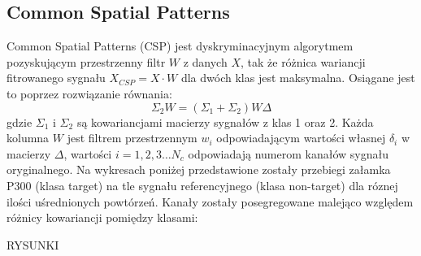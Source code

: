\documentclass[licencjacka,openright]{pracamgr}
\begin{document}
\subsection{Common Spatial Patterns}
Common Spatial Patterns (CSP) jest dyskryminacyjnym algorytmem pozyskującym przestrzenny filtr $W$ z danych $X$, tak że różnica wariancji fitrowanego sygnału $X_{CSP} = X \cdot W$ dla dwóch klas jest maksymalna. Osiągane jest to poprzez rozwiązanie równania:
\begin{equation}
\Sigma _2 W = (\Sigma _1 + \Sigma _2 )W \Delta
\end{equation}
gdzie $\Sigma_1$ i $\Sigma_2$ są kowariancjami macierzy sygnałów z klas 1 oraz 2. Każda kolumna $W$ jest filtrem przestrzennym $w_i$ odpowiadającym wartości własnej $\delta _i$ w macierzy $\Delta$, wartości $i = 1,2,3 \ldots N_c$ odpowiadają numerom kanałów sygnału oryginalnego. \citep{sannelli2011}
Na wykresach poniżej przedstawione zostały przebiegi załamka P300 (klasa target) na tle sygnału referencyjnego (klasa non-target) dla róznej ilości uśrednionych powtórzeń. Kanały zostały posegregowane malejąco względem różnicy kowariancji pomiędzy klasami:

RYSUNKI






\end{document}
